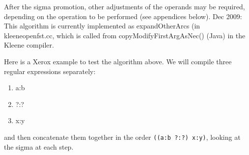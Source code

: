 \documentclass[letterpaper,11pt]{article}
\begin{document}
\noindent
After the sigma promotion, other adjustments of the operands may be required,
depending on the operation to be performed (see appendices below).
Dec 2009: This algorithm is currently implemented as expandOtherArcs (in
kleeneopenfst.cc, which is called from copyModifyFirstArgAsNec()
(Java) in the Kleene compiler.

Here is a Xerox example to test the algorithm above.  We will compile three regular expressions
separately:

\begin{enumerate}

\item
a:b

\item
?:?

\item
x:y

\end{enumerate}

\noindent
and then concatenate them together in the order \texttt{((a:b~?:?)~x:y)}, looking at the sigma at each
step.
\end{document}
